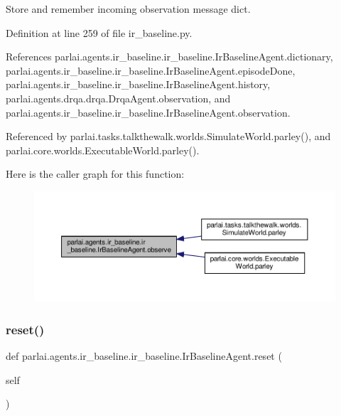 \begin{DoxyVerb}Store and remember incoming observation message dict.\end{DoxyVerb}
 

Definition at line 259 of file ir\+\_\+baseline.\+py.



References parlai.\+agents.\+ir\+\_\+baseline.\+ir\+\_\+baseline.\+Ir\+Baseline\+Agent.\+dictionary, parlai.\+agents.\+ir\+\_\+baseline.\+ir\+\_\+baseline.\+Ir\+Baseline\+Agent.\+episode\+Done, parlai.\+agents.\+ir\+\_\+baseline.\+ir\+\_\+baseline.\+Ir\+Baseline\+Agent.\+history, parlai.\+agents.\+drqa.\+drqa.\+Drqa\+Agent.\+observation, and parlai.\+agents.\+ir\+\_\+baseline.\+ir\+\_\+baseline.\+Ir\+Baseline\+Agent.\+observation.



Referenced by parlai.\+tasks.\+talkthewalk.\+worlds.\+Simulate\+World.\+parley(), and parlai.\+core.\+worlds.\+Executable\+World.\+parley().

Here is the caller graph for this function\+:
\nopagebreak
\begin{figure}[H]
\begin{center}
\leavevmode
\includegraphics[width=350pt]{classparlai_1_1agents_1_1ir__baseline_1_1ir__baseline_1_1IrBaselineAgent_ad5edc81f811cfdd89c8518619f5ae15a_icgraph}
\end{center}
\end{figure}
\mbox{\label{classparlai_1_1agents_1_1ir__baseline_1_1ir__baseline_1_1IrBaselineAgent_adc3f036e92741d87db95e47dfc5fc0ef}} 
\subsubsection{\texorpdfstring{reset()}{reset()}}
{\footnotesize\ttfamily def parlai.\+agents.\+ir\+\_\+baseline.\+ir\+\_\+baseline.\+Ir\+Baseline\+Agent.\+reset (\begin{DoxyParamCaption}\item[{}]{self }\end{DoxyParamCaption})}

